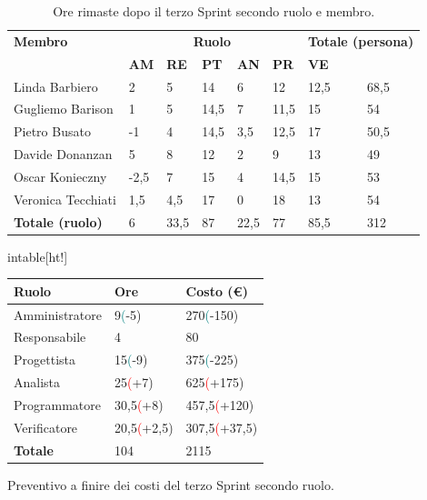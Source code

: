 \begin{table}[ht!]
	\centering
	\begin{tabular}{p{3cm} p{1.4cm} p{1.6cm} p{1.5cm} p{1.5cm} p{1.5cm} p{1.5cm} p{2cm}}
		\toprule
        \textbf{Membro} & \multicolumn{5}{c}{\textbf{Ruolo}} & \multicolumn{2}{r}{\textbf{Totale (persona)}}\\
		& \textbf{AM} & \textbf{RE} & \textbf{PT} & \textbf{AN} & \textbf{PR} & \textbf{VE}\\
		\midrule
        Linda Barbiero     & 2 & 5 & 14 & 6 & 12 & 12,5 & 68,5 \\
        Gugliemo Barison   & 1 & 5 & 14,5 & 7 & 11,5 & 15 & 54 \\
        Pietro Busato      & -1& 4 & 14,5 & 3,5 & 12,5 & 17 & 50,5 \\
        Davide Donanzan    & 5 & 8 & 12 & 2 & 9 & 13 & 49 \\
        Oscar Konieczny    & -2,5 & 7 & 15 & 4 & 14,5 & 15 & 53 \\
        Veronica Tecchiati & 1,5 & 4,5 & 17 & 0 & 18 & 13 & 54 \\
        \midrule
        \textbf{Totale (ruolo)} & 6 & 33,5 & 87 & 22,5 & 77 & 85,5 & 312 \\
		\bottomrule
	\end{tabular}
	\caption{Ore rimaste dopo il terzo Sprint secondo ruolo e membro.}
	\label{table:Ore rimaste dopo il terzo Sprint secondo ruolo e membro.}
\end{table}
in{table}[ht!]
    \centering
    \begin{tabular}{p{4cm} p{1.8cm} p{2.2cm}}
        \toprule
        \textbf{Ruolo} & \textbf{Ore} & \textbf{Costo (€)} \\
        \midrule
        Amministratore & 9\textcolor{teal}(-5) & 270\textcolor{teal}(-150) \\
        Responsabile & 4  & 80 \\
        Progettista & 15\textcolor{teal}(-9)  & 375\textcolor{teal}(-225) \\
        Analista & 25\textcolor{red}(+7) & 625\textcolor{red}(+175) \\
        Programmatore & 30,5\textcolor{red}(+8) & 457,5\textcolor{red}(+120) \\
        Verificatore & 20,5\textcolor{red}(+2,5) & 307,5\textcolor{red}(+37,5) \\
        \bottomrule
        \textbf{Totale} & 104 & 2115
    \end{tabular}
    \caption{Preventivo a finire dei costi del terzo Sprint secondo ruolo.}
